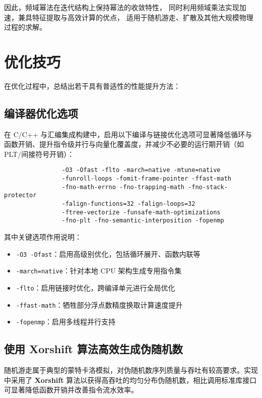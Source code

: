 \documentclass[a4paper,12pt]{article}
\begin{document}
\begin{CJK}{UTF8}{gbsn}
\begin{itemize}
		      因此，频域幂法在迭代结构上保持幂法的收敛特性，
		      同时利用频域乘法实现加速，兼具特征提取与高效计算的优点，
		      适用于随机游走、扩散及其他大规模物理过程的求解。
	\end{itemize}


	\section{优化技巧}
	在优化过程中，总结出若干具有普适性的性能提升方法：

	\subsection{编译器优化选项}
	在 C/C++ 与汇编集成构建中，启用以下编译与链接优化选项可显著降低循环与函数开销、提升指令级并行与向量化覆盖度，并减少不必要的运行期开销（如 PLT/间接符号开销）：
	\begin{verbatim}
				-O3 -Ofast -flto -march=native -mtune=native
				-funroll-loops -fomit-frame-pointer -ffast-math
				-fno-math-errno -fno-trapping-math -fno-stack-protector
				-falign-functions=32 -falign-loops=32
				-ftree-vectorize -funsafe-math-optimizations
				-fno-plt -fno-semantic-interposition -fopenmp
			\end{verbatim}

	其中关键选项作用说明：

	\begin{itemize}

		\item \texttt{-O3 -Ofast}：启用高级别优化，包括循环展开、函数内联等

		\item \texttt{-march=native}：针对本地 CPU 架构生成专用指令集

		\item \texttt{-flto}：启用链接时优化，跨编译单元进行全局优化

		\item \texttt{-ffast-math}：牺牲部分浮点数精度换取计算速度提升

		\item \texttt{-fopenmp}：启用多线程并行支持

	\end{itemize}

	\subsection{使用 Xorshift 算法高效生成伪随机数}
	随机游走属于典型的蒙特卡洛模拟，对伪随机数序列质量与吞吐有较高要求。实现中采用了 \textbf{Xorshift} 算法以获得高吞吐的均匀分布伪随机数，相比调用标准库接口可显著降低函数开销并改善指令流水效率。


\end{CJK}
\end{document}
